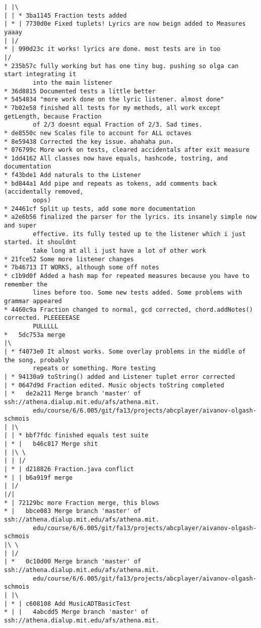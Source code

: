 \documentclass[12pt]{book}
\begin{document}
\begin{Verbatim}
| |\
| | * 3ba1145 Fraction tests added
| * | 7730d0e Fixed tuplets! Lyrics are now beign added to Measures yaaay
| |/
* | 990d23c it works! lyrics are done. most tests are in too
|/
* 235b57c fully working but has one tiny bug. pushing so olga can start integrating it 
        into the main listener
* 36d8815 Documented tests a little better
* 5454834 "more work done on the lyric listener. almost done"
* 7b02e58 finished all tests for my methods, all work except getLength, because Fraction 
        of 2/3 doesnt equal Fraction of 2/3. Sad times.
* de8550c new Scales file to account for ALL octaves
* 8e59438 Corrected the key issue. ahahaha pun.
* 076799c More work on tests, cleared accidentals after exit measure
* 1dd4162 All classes now have equals, hashcode, tostring, and documentation
* f43bde1 Add naturals to the Listener
* bd844a1 Add pipe and repeats as tokens, add comments back (accidentally removed, 
        oops)
* 24461cf Split up tests, add some more documentation
* a2e6b56 finalized the parser for the lyrics. its insanely simple now and super 
        effective. its fully tested up to the listener which i just started. it shouldnt 
        take long at all i just have a lot of other work
* 21fce52 Some more listener changes
* 7b46713 IT WORKS, although some off notes
* c1b9d0f Added a hash map for repeated measures because you have to remember the 
        lines before too. Some new tests added. Some problems with grammar appeared
* 4460c9a Fraction changed to normal, gcd corrected, chord.addNotes() corrected. PLEEEEEASE 
        PULLLLL
*   5dc753a merge
|\
| * f4073e0 It almost works. Some overlay problems in the middle of the song, probably 
        repeats or something. More testing
| * 94130a9 toString() added and Listener tuplet error corrected
| * 0647d9d Fraction edited. Music objects toString completed
| *   de2a211 Merge branch 'master' of ssh://athena.dialup.mit.edu/afs/athena.mit.
        edu/course/6/6.005/git/fa13/projects/abcplayer/aivanov-olgash-schmois
| |\
| | * bbf7fdc finished equals test suite
| * |   b46c817 Merge shit
| |\ \
| | |/
| * | d218826 Fraction.java conflict
* | | b6a919f merge
| |/
|/|
* | 72129bc more Fraction merge, this blows
* |   bbce083 Merge branch 'master' of ssh://athena.dialup.mit.edu/afs/athena.mit.
        edu/course/6/6.005/git/fa13/projects/abcplayer/aivanov-olgash-schmois
|\ \
| |/
| *   0c10d00 Merge branch 'master' of ssh://athena.dialup.mit.edu/afs/athena.mit.
        edu/course/6/6.005/git/fa13/projects/abcplayer/aivanov-olgash-schmois
| |\
| * | c608108 Add MusicADTBasicTest
* | |   4abcdd5 Merge branch 'master' of ssh://athena.dialup.mit.edu/afs/athena.mit.

\end{Verbatim}
\end{document}
